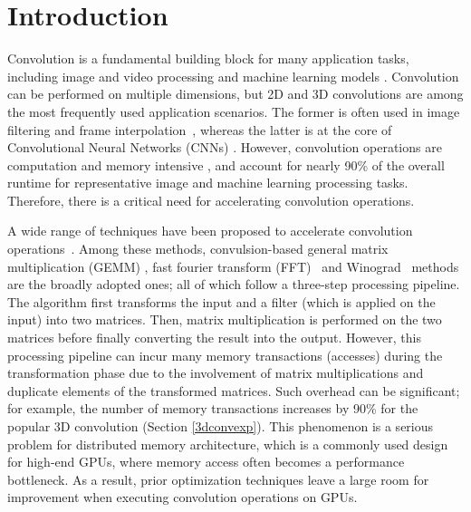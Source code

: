 \section{Introduction}
Convolution is a fundamental building block for many application tasks, including image and video processing and machine learning
models \cite{Perrot2014Fine,Ma2014Optimized,Rudi2015Image,Niklaus2017Video,Krizhevsky2012ImageNet,SimonyanZ14a,HeZRS16,SzegedyLJSRAEVR15}. Convolution can be performed on multiple dimensions, but 2D and 3D convolutions are among the most frequently used
application scenarios. The former is often used in image filtering and frame
interpolation~\cite{Perrot2014Fine,Ma2014Optimized,Rudi2015Image,Niklaus2017Video}, whereas the latter is at the core of Convolutional
Neural Networks (CNNs) \cite{Krizhevsky2012ImageNet,SimonyanZ14a,HeZRS16,SzegedyLJSRAEVR15}. However, convolution operations are computation and memory intensive \cite{cavigelli2015accelerating},
and account for nearly 90\% of the overall runtime \cite{Li2016Performance} for representative image and machine learning processing tasks.
Therefore, there is a critical need for accelerating convolution operations.


A wide range of techniques have been proposed to accelerate convolution
operations~\cite{Iandola2014Communication,vasilache2014fast,lavin2016fast,cho2017mec,Zhen2018Optimizing,Vasudevan2017Parallel,Chellapilla2006High}.
Among these methods, convulsion-based general matrix multiplication (GEMM) \cite{Vasudevan2017Parallel,Chellapilla2006High}, fast fourier transform (FFT)~\cite{vasilache2014fast} and
Winograd~\cite{lavin2016fast} methods are the broadly adopted ones;  all of which follow a
three-step processing pipeline. The algorithm first transforms the input and a filter (which is applied on the input) into
two matrices. Then, matrix multiplication is performed on the two matrices before finally converting the result into the output.
However, this processing pipeline can incur many memory transactions (accesses) during the
transformation phase due to the involvement of matrix multiplications and duplicate elements of the transformed
matrices. Such overhead can be significant; for example, the number of memory transactions increases 
by 90\% for the popular 3D convolution (Section \ref{3dconvexp}). This phenomenon is a serious problem for distributed memory
architecture, which is a commonly used design for high-end GPUs, where memory access often becomes a performance bottleneck. As a
result, prior optimization techniques leave a large room for improvement when executing convolution operations on GPUs.


